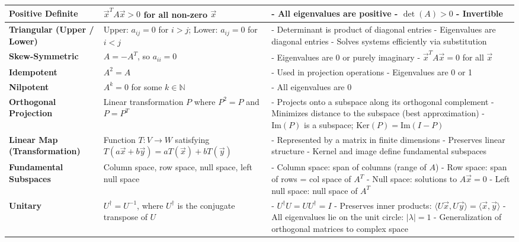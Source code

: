 \documentclass[12pt]{article}
\begin{document}
\begin{longtable}{|>{\bfseries}m{3.5cm}|m{5cm}|m{7cm}|}
\hline
Positive Definite & $\vec{x}^T A \vec{x} > 0$ for all non-zero $\vec{x}$ & 
- All eigenvalues are positive \newline
- $\det(A) > 0$ \newline
- Invertible \\
\hline
Triangular (Upper / Lower) & 
Upper: $a_{ij} = 0$ for $i > j$; Lower: $a_{ij} = 0$ for $i < j$ & 
- Determinant is product of diagonal entries \newline
- Eigenvalues are diagonal entries \newline
- Solves systems efficiently via substitution \\
\hline
Skew-Symmetric & $A = -A^T$, so $a_{ii} = 0$ & 
- Eigenvalues are 0 or purely imaginary \newline
- $\vec{x}^T A \vec{x} = 0$ for all $\vec{x}$ \\
\hline
Idempotent & $A^2 = A$ & 
- Used in projection operations \newline
- Eigenvalues are 0 or 1 \\
\hline
Nilpotent & $A^k = 0$ for some $k \in \mathbb{N}$ & 
- All eigenvalues are 0 \\
\hline
\hline
Orthogonal Projection & Linear transformation $P$ where $P^2 = P$ and $P = P^T$ & 
- Projects onto a subspace along its orthogonal complement \newline
- Minimizes distance to the subspace (best approximation) \newline
- $\text{Im}(P)$ is a subspace; $\text{Ker}(P) = \text{Im}(I - P)$ \\
\hline
Linear Map (Transformation) & Function $T: V \rightarrow W$ satisfying $T(a\vec{x} + b\vec{y}) = aT(\vec{x}) + bT(\vec{y})$ & 
- Represented by a matrix in finite dimensions \newline
- Preserves linear structure \newline
- Kernel and image define fundamental subspaces \\
\hline
Fundamental Subspaces & Column space, row space, null space, left null space & 
- Column space: span of columns (range of $A$) \newline
- Row space: span of rows = col space of $A^T$ \newline
- Null space: solutions to $A\vec{x} = 0$ \newline
- Left null space: null space of $A^T$ \\
\hline
Unitary & $U^\dagger = U^{-1}$, where $U^\dagger$ is the conjugate transpose of $U$ & 
- $U^\dagger U = U U^\dagger = I$ \newline
- Preserves inner products: $\langle U\vec{x}, U\vec{y} \rangle = \langle \vec{x}, \vec{y} \rangle$ \newline
- All eigenvalues lie on the unit circle: $|\lambda| = 1$ \newline
- Generalization of orthogonal matrices to complex space \\
\hline

\end{longtable}
\end{document}
